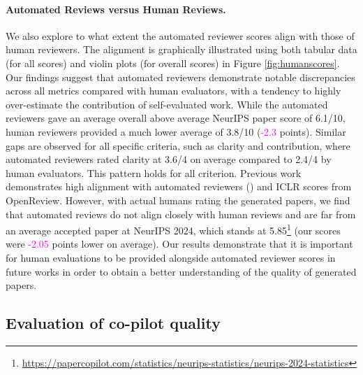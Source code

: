 \documentclass[11pt, a4paper]{gdm_format}
\begin{document}
\paragraph{Automated Reviews versus Human Reviews.} We also explore to what extent the automated reviewer scores align with those of human reviewers. The alignment is graphically illustrated using both tabular data (for all scores) and violin plots (for overall scores) in Figure \ref{fig:humanscores}. Our findings suggest that automated reviewers demonstrate notable discrepancies across all metrics compared with human evaluators, with a tendency to highly over-estimate the contribution of self-evaluated work. While the automated reviewers gave an average overall above average NeurIPS paper score of 6.1/10, human reviewers provided a much lower average of 3.8/10 (\textcolor{Magenta}{-2.3} points). Similar gaps are observed for all specific criteria, such as clarity and contribution, where automated reviewers rated clarity at 3.6/4 on average compared to 2.4/4 by human evaluators. This pattern holds for all criterion. Previous work demonstrates high alignment with automated reviewers (\cite{lu2024aiscientist}) and ICLR scores from OpenReview. However, with actual humans rating the generated papers, we find that automated reviews do not align closely with human reviews and are far from an average accepted paper at NeurIPS 2024, which stands at 5.85\footnote{\href{https://papercopilot.com/statistics/neurips-statistics/neurips-2024-statistics/}{https://papercopilot.com/statistics/neurips-statistics/neurips-2024-statistics}} (our scores were \textcolor{Magenta}{-2.05} points lower on average). Our results demonstrate that it is important for human evaluations to be provided alongside automated reviewer scores in future works in order to obtain a better understanding of the quality of generated papers.



\subsection{Evaluation of co-pilot quality}
\end{document}
